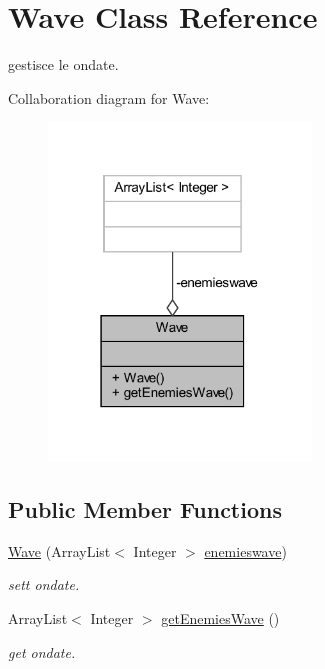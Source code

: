 \hypertarget{classevents_1_1_wave}{}\section{Wave Class Reference}
\label{classevents_1_1_wave}


gestisce le ondate.  




Collaboration diagram for Wave\+:\nopagebreak
\begin{figure}[H]
\begin{center}
\leavevmode
\includegraphics[width=198pt]{classevents_1_1_wave__coll__graph}
\end{center}
\end{figure}
\subsection*{Public Member Functions}
\begin{DoxyCompactItemize}
\item 
\hyperlink{classevents_1_1_wave_a43d1aadca6968f6a8b718880fd19aaa4}{Wave} (Array\+List$<$ Integer $>$ \hyperlink{classevents_1_1_wave_af2cde6170a7bb973c8a1b5851deaa0e5}{enemieswave})
\begin{DoxyCompactList}\small\item\em sett ondate. \end{DoxyCompactList}\item 
Array\+List$<$ Integer $>$ \hyperlink{classevents_1_1_wave_a196ea1965f3292364029770fc56b2dbc}{get\+Enemies\+Wave} ()
\begin{DoxyCompactList}\small\item\em get ondate. \end{DoxyCompactList}\end{DoxyCompactItemize}
